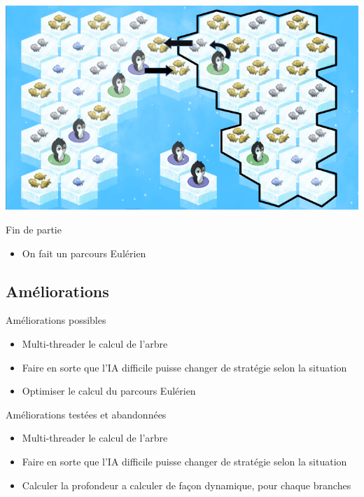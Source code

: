 \documentclass{beamer}
\begin{document}
\begin{frame}{}
\begin{block}{}
\begin{center}
 \includegraphics[scale=0.4]{IA9}
\end{center}
\end{block}
\end{frame}

\begin{frame}{}
\begin{block}{Fin de partie}
\begin{itemize}
  \item{On fait un parcours Eulérien}
\end{itemize}
\end{block}
\end{frame}


\subsection{Améliorations}
\begin{frame}{}
\begin{block}{Améliorations possibles}
\begin{itemize}
 \item<1-> Multi-threader le calcul de l’arbre
 \item<2-> Faire en sorte que l’IA difficile puisse changer de stratégie selon la situation
 \item<3-> Optimiser le calcul du parcours Eulérien
\end{itemize}
\end{block}
\begin{block}{Améliorations testées et abandonnées}
\begin{itemize}
 \item<1-> Multi-threader le calcul de l’arbre
 \item<2-> Faire en sorte que l’IA difficile puisse changer de stratégie selon la situation
 \item<3-> Calculer la profondeur a calculer de façon dynamique, pour chaque branches
\end{itemize}
\end{block}
\end{frame}
\end{document}
